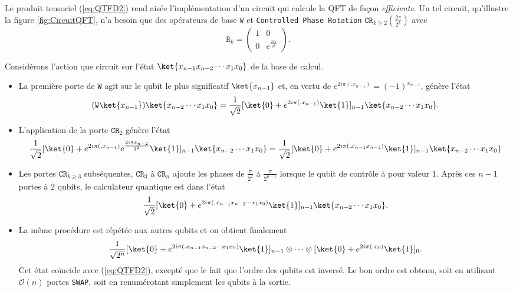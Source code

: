 Le produit tensoriel (\ref{eq:QTFD2}) rend aisée l'implémentation d'un circuit
qui calcule la QFT de façon \emph{efficiente}. Un tel circuit, qu'illustre la
figure \ref{fig:CircuitQFT}, n'a besoin que des opérateurs de base $\mathtt{W}$
et \texttt{Controlled Phase Rotation} $\mathtt{CR}_{k\geq2}(\frac{2\pi}{2^{k}})$
avec
\begin{equation}
\mathtt{R}_{k}=\begin{pmatrix}
1 & 0\\
0 & e^{\frac{2i\pi}{2^{k}}}
\end{pmatrix}.
\end{equation}

Considérons l'action que circuit sur l'état $\ket{x_{n-1}x_{n-2}\cdots x_1x_0}$
de la base de calcul.

\begin{itemize}
\item La première porte de \texttt{W} agit sur le qubit le plus significatif
$\ket{x_{n-1}}$ et, en vertu de $e^{2i\pi(.x_{n-1})}=(-1)^{x_{n-1}}$, génère
l'état
\begin{equation}
(\mathtt{W}\ket{x_{n-1}})\ket{x_{n-2}\cdots x_1x_0}=\frac{1}{\sqrt{2}}
[\ket{0}+e^{2i\pi(.x_{n-1})}\ket{1}]_{n-1}\ket{x_{n-2}\cdots x_1x_0}.
\end{equation}

\item L'application de la porte $\mathtt{CR}_2$ génère l'état
\begin{equation}
\frac{1}{\sqrt{2}}[\ket{0}+e^{2i\pi(.x_{n-1})}e^{\frac{2i\pi x_{n-2}}{2^2}}
\ket{1}]_{n-1}\ket{x_{n-2}\cdots x_1x_0}=\frac{1}{\sqrt{2}}[\ket{0}
+e^{2i\pi(.x_{n-1}{x_{n-2}})}\ket{1}]_{n-1}\ket{x_{n-2}\cdots x_1x_0}
\end{equation}

\item Les portes $\mathtt{CR}_{k\geq3}$ subséquentes, $\mathtt{CR}_3$ à
$\mathtt{CR}_n$ ajoute les phases de $\frac{\pi}{2^2}$ à $\frac{\pi}{2^{n-1}}$
lorsque le qubit de contrôle à pour valeur $1$. Après ces $n-1$ portes à $2$
qubits, le calculateur quantique est dans l'état%
\begin{equation}
\frac{1}{\sqrt{2}}[\ket{0}+e^{2i\pi(.x_{n-1}x_{n-2}\cdots x_1x_0)}\ket{1}]_{n-1}
\ket{x_{n-2}\cdots x_1x_0}.
\end{equation}
\item La même procédure est répétée aux autres qubits et on obtient finalement%
\begin{equation}
\frac{1}{\sqrt{2^n}}[\ket{0}+e^{2i\pi(.x_{n-1}x_{n-2}\cdots x_1x_0)}\ket{1}
]_{n-1}\otimes\cdots\otimes[\ket{0}+e^{2i\pi(.x_0)}\ket{1}]_0.
\end{equation}
Cet état coïncide avec (\ref{eq:QTFD2}), excepté que le fait que l'ordre des
qubits est inversé. Le bon ordre est obtenu, soit en utilisant $\mathcal{O}(n)$
portes \texttt{SWAP}, soit en renumérotant simplement les qubits à la
sortie.
\end{itemize}

